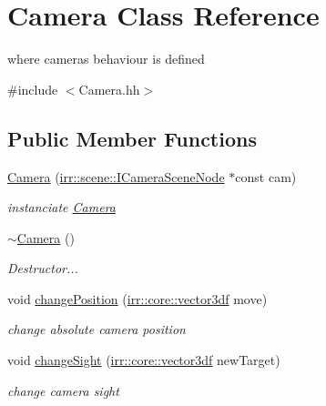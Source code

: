 \hypertarget{classCamera}{}\section{Camera Class Reference}
\label{classCamera}


where cameras behaviour is defined  




{\ttfamily \#include $<$Camera.\+hh$>$}

\subsection*{Public Member Functions}
\begin{DoxyCompactItemize}
\item 
\hyperlink{classCamera_a4ffc956956f49716d7fa3bff2591cd3a}{Camera} (\hyperlink{classirr_1_1scene_1_1ICameraSceneNode}{irr\+::scene\+::\+I\+Camera\+Scene\+Node} $\ast$const cam)
\begin{DoxyCompactList}\small\item\em instanciate \hyperlink{classCamera}{Camera} \end{DoxyCompactList}\item 
\mbox{\label{classCamera_ad1897942d0ccf91052386388a497349f}} 
\hyperlink{classCamera_ad1897942d0ccf91052386388a497349f}{$\sim$\+Camera} ()
\begin{DoxyCompactList}\small\item\em Destructor... \end{DoxyCompactList}\item 
void \hyperlink{classCamera_ad7d58a7f1ab2b31f120a0bdad677b300}{change\+Position} (\hyperlink{namespaceirr_1_1core_ae6e2b2a6c552833ebbd5b7463d03586b}{irr\+::core\+::vector3df} move)
\begin{DoxyCompactList}\small\item\em change absolute camera position \end{DoxyCompactList}\item 
void \hyperlink{classCamera_a8c11f289be05671191a4f91288155685}{change\+Sight} (\hyperlink{namespaceirr_1_1core_ae6e2b2a6c552833ebbd5b7463d03586b}{irr\+::core\+::vector3df} new\+Target)
\begin{DoxyCompactList}\small\item\em change camera sight \end{DoxyCompactList}\end{DoxyCompactItemize}



